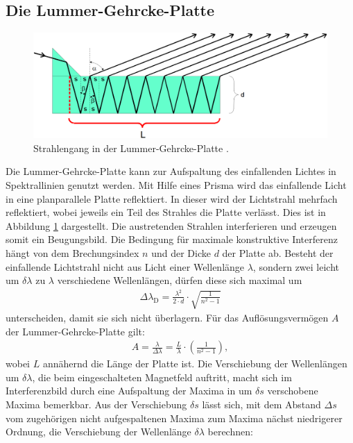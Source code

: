 \subsection{Die Lummer-Gehrcke-Platte}
\begin{figure}
	\centering
	\includegraphics[width=\linewidth-50pt,height=\textheight-50pt,keepaspectratio]{content/Images/lummerPlatte.png}
    \caption{Strahlengang in der Lummer-Gehrcke-Platte \cite{V27}.}
    \label{fig:lummerPlatte}
\end{figure}
Die Lummer-Gehrcke-Platte kann zur Aufspaltung des einfallenden Lichtes in Spektrallinien genutzt werden. Mit Hilfe eines Prisma wird das einfallende Licht in eine planparallele Platte reflektiert. In dieser wird der Lichtstrahl mehrfach reflektiert, wobei jeweils ein Teil des Strahles die Platte verlässt. Dies ist in Abbildung \ref{fig:lummerPlatte} dargestellt. Die austretenden Strahlen interferieren und erzeugen somit ein Beugungsbild. Die Bedingung für maximale konstruktive Interferenz hängt von dem Brechungsindex $n$ und der Dicke $d$ der Platte ab. Besteht der einfallende Lichtstrahl nicht aus Licht einer Wellenlänge $\lambda$, sondern zwei leicht um $\delta \lambda$ zu $\lambda$ verschiedene Wellenlängen, dürfen diese sich maximal um
\begin{gather}
	\Delta\lambda_\text{D} = \frac{\lambda^2}{2 \cdot d} \cdot \sqrt{\frac{1}{n^2-1}} \label{eq:disGebiet}
\end{gather}
unterscheiden, damit sie sich nicht überlagern.
Für das Auflösungsvermögen $A$ der Lummer-Gehrcke-Platte gilt:
\begin{gather}
	A = \frac{\lambda}{\Delta\lambda} = \frac{L}{\lambda} \cdot \left(\frac{1}{n^2-1}\right), \label{eq:Aufloesung}
\end{gather}
wobei $L$ annähernd die Länge der Platte ist.
Die Verschiebung der Wellenlängen um $\delta \lambda$, die beim eingeschalteten Magnetfeld auftritt, macht sich im Interferenzbild durch eine Aufspaltung der Maxima in um $\delta s $ verschobene Maxima bemerkbar. Aus der Verschiebung $\delta s$ lässt sich, mit dem Abstand $\Delta s$ vom zugehörigen nicht aufgespaltenen Maxima zum Maxima nächst niedrigerer Ordnung, die Verschiebung der Wellenlänge $\delta \lambda$ berechnen:
